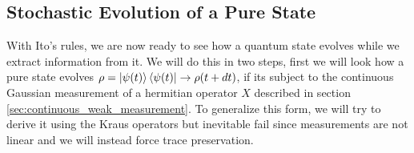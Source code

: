 


\subsection{Stochastic Evolution of a Pure State}
With Ito's rules, we are now ready to see how a quantum state evolves while we extract information from it. We will do this in two steps, first we will look how a pure state evolves $\rho = \ket{\psi(t)}\bra{\psi(t)} \to \rho(t+dt)$, if its subject to the continuous Gaussian measurement of a hermitian operator $X$ described in section \ref{sec:continuous_weak_measurement}. To generalize this form, we will try to derive it using the Kraus operators but inevitable fail since measurements are not linear and we will instead force trace preservation.

